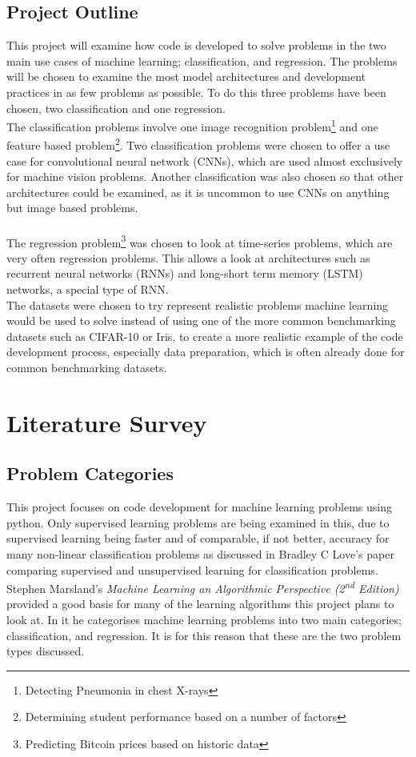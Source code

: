 \documentclass[12pt,a4paper,titlepage]{book}
\begin{document}
\section{Project Outline}
	This project will examine how code is developed to solve problems in the two main use cases of machine learning; classification, and regression. The problems will be chosen to examine the most model architectures and development practices in as few problems as possible. To do this three problems have been chosen, two classification and one regression. \\
	The classification problems involve one image recognition problem\footnote{Detecting Pneumonia in chest X-rays} and one feature based problem\footnote{Determining student performance based on a number of factors}. Two classification problems were chosen to offer a use case for convolutional neural network (CNNs), which are used almost exclusively for machine vision problems. Another classification was also chosen so that other architectures could be examined, as it is uncommon to use CNNs on anything but image based problems. \\ \\
	The regression problem\footnote{Predicting Bitcoin prices based on historic data} was chosen to look at time-series problems, which are very often regression problems. This allows a look at architectures such as recurrent neural networks (RNNs) and long-short term memory (LSTM) networks, a special type of RNN. \\
	The datasets were chosen to try represent realistic problems machine learning would be used to solve instead of using one of the more common benchmarking datasets such as CIFAR-10\cite{cifar-10} or Iris, to create a more realistic example of the code development process, especially data preparation, which is often already done for common benchmarking datasets.


\chapter{Literature Survey}
\section{Problem Categories}
	This project focuses on code development for machine learning problems using python. Only supervised learning problems are being examined in this, due to supervised learning being faster and of comparable, if not better, accuracy for many non-linear classification problems as discussed in Bradley C Love's paper comparing supervised and unsupervised learning for classification problems\cite{supervised-vs-unsupervised}. Stephen Marsland's \textit{Machine Learning an Algorithmic Perspective (2\textsuperscript{nd} Edition)}\cite{ml-algorithmic-perspective} provided a good basis for many of the learning algorithms this project plans to look at. In it he categorises machine learning problems into two main categories; classification, and regression. It is for this reason that these are the two problem types discussed.
\end{document}
